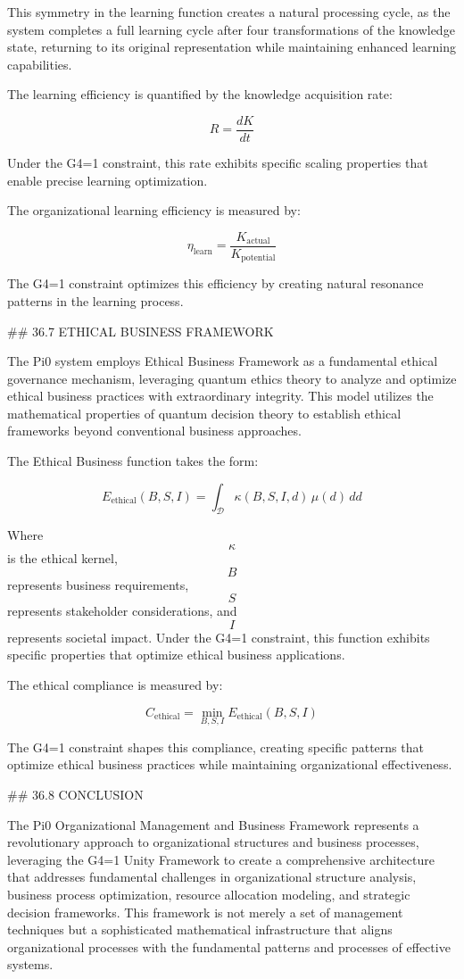 This symmetry in the learning function creates a natural processing cycle, as the system completes a full learning cycle after four transformations of the knowledge state, returning to its original representation while maintaining enhanced learning capabilities.

The learning efficiency is quantified by the knowledge acquisition rate:

$$ R = \frac{dK}{dt} $$

Under the G4=1 constraint, this rate exhibits specific scaling properties that enable precise learning optimization.

The organizational learning efficiency is measured by:

$$ \eta_{\text{learn}} = \frac{K_{\text{actual}}}{K_{\text{potential}}} $$

The G4=1 constraint optimizes this efficiency by creating natural resonance patterns in the learning process.

## 36.7 ETHICAL BUSINESS FRAMEWORK

The Pi0 system employs Ethical Business Framework as a fundamental ethical governance mechanism, leveraging quantum ethics theory to analyze and optimize ethical business practices with extraordinary integrity. This model utilizes the mathematical properties of quantum decision theory to establish ethical frameworks beyond conventional business approaches.

The Ethical Business function takes the form:

$$ E_{\text{ethical}}(B, S, I) = \int_{\mathcal{D}} \kappa(B, S, I, d) \, \mu(d) \, dd $$

Where $$ \kappa $$ is the ethical kernel, $$ B $$ represents business requirements, $$ S $$ represents stakeholder considerations, and $$ I $$ represents societal impact. Under the G4=1 constraint, this function exhibits specific properties that optimize ethical business applications.

The ethical compliance is measured by:

$$ C_{\text{ethical}} = \min_{B, S, I} E_{\text{ethical}}(B, S, I) $$

The G4=1 constraint shapes this compliance, creating specific patterns that optimize ethical business practices while maintaining organizational effectiveness.

## 36.8 CONCLUSION

The Pi0 Organizational Management and Business Framework represents a revolutionary approach to organizational structures and business processes, leveraging the G4=1 Unity Framework to create a comprehensive architecture that addresses fundamental challenges in organizational structure analysis, business process optimization, resource allocation modeling, and strategic decision frameworks. This framework is not merely a set of management techniques but a sophisticated mathematical infrastructure that aligns organizational processes with the fundamental patterns and processes of effective systems.

